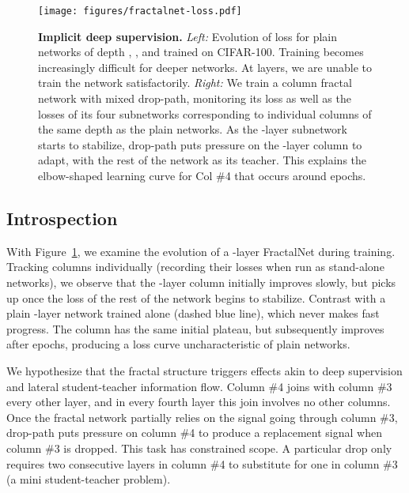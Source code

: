 \documentclass{article}
\newcommand{\fracnet}{FractalNet}
\newcommand{\droppath}{drop-path}
\begin{document}
\begin{figure}
   \begin{center}
      \texttt{[image: figures/fractalnet-loss.pdf]}
   \end{center}
   \vspace{-0.4cm}
   \caption{
      \textbf{Implicit deep supervision.}
      \emph{Left:}
         Evolution of loss for plain networks of depth , ,  and
          trained on CIFAR-100.  Training becomes increasingly difficult
         for deeper networks.  At  layers, we are unable to train the
         network satisfactorily.
      \emph{Right:}
         We train a  column fractal network with mixed \droppath{},
         monitoring its loss as well as the losses of its four subnetworks
         corresponding to individual columns of the same depth as the plain
         networks.  As the -layer subnetwork starts to stabilize,
         \droppath{} puts pressure on the -layer column to adapt, with the
         rest of the network as its teacher.  This explains the elbow-shaped
         learning curve for Col \#4 that occurs around  epochs.
   }
\label{fig:fractalnet-loss}
\end{figure}

\subsection{Introspection}
\label{sec:introspection}

With Figure~\ref{fig:fractalnet-loss}, we examine the evolution of a -layer
{\fracnet} during training.  Tracking columns individually (recording their
losses when run as stand-alone networks), we observe that the -layer column
initially improves slowly, but picks up once the loss of the rest of the
network begins to stabilize.  Contrast with a plain -layer network trained
alone (dashed blue line), which never makes fast progress.  The column has the
same initial plateau, but subsequently improves after  epochs, producing a
loss curve uncharacteristic of plain networks.

We hypothesize that the fractal structure triggers effects akin to deep
supervision and lateral student-teacher information flow.  Column \#4 joins
with column \#3 every other layer, and in every fourth layer this join
involves no other columns.  Once the fractal network partially relies on the
signal going through column \#3, {\droppath} puts pressure on column \#4 to
produce a replacement signal when column \#3 is dropped.  This task has
constrained scope.  A particular drop only requires two consecutive layers in
column \#4 to substitute for one in column \#3 (a mini student-teacher
problem).
\end{document}
